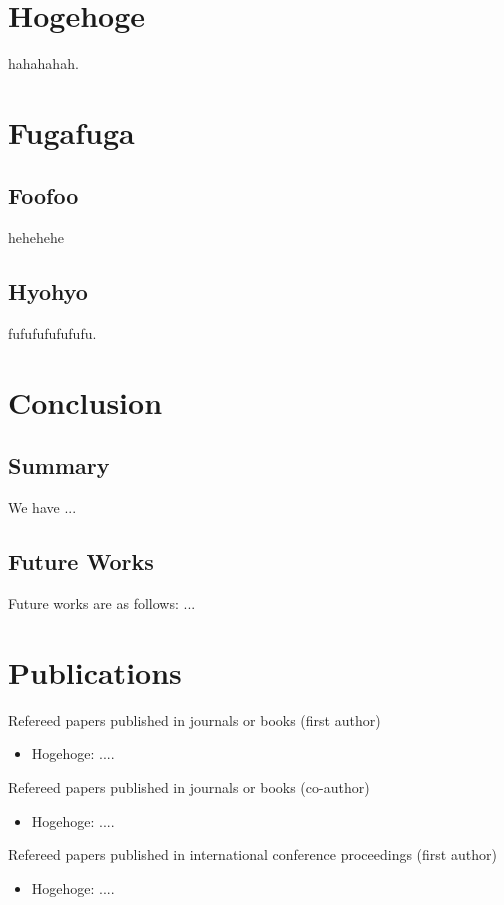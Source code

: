 \documentclass[12pt,epsf]{report}
\begin{document}
{\chapter{Hogehoge}

hahahahah.

\chapter{Fugafuga}
\section{Foofoo}
hehehehe

\section{Hyohyo}

fufufufufufufu.

\chapter{Conclusion}
\section{Summary}

We have ...

\section{Future Works}

Future works are as follows: ...

\newpage

\chapter*{Publications}

\begin{list}%
 {} %
 {} %
 \item Refereed papers published in journals or books (first author)
       \begin{itemize}
	\item Hogehoge: ....
       \end{itemize}
 \item Refereed papers published in journals or books (co-author)
       \begin{itemize}
	\item Hogehoge: ....
       \end{itemize}
 \item Refereed papers published in international conference proceedings (first author)       \begin{itemize}
	\item Hogehoge: ....
       \end{itemize}


\end{list}}
\end{document}
